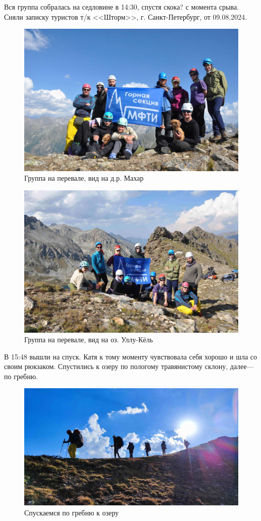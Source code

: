 Вся группа собралась на седловине в 14:30, спустя \alert{скока?} с момента срыва. Сняли записку туристов т/к <<Шторм>>, г. Санкт-Петербург, от 09.08.2024.

\begin{figure}[h!]
	\centering
	\includegraphics[width=0.7\linewidth]{../pics/DSC_0982}
	\caption{Группа на перевале, вид на д.р. Махар}
	\label{fig:DSC_0982}
\end{figure}

\begin{figure}[h!]
	\centering
	\includegraphics[width=0.7\linewidth]{../pics/DSC_0986}
	\caption{Группа на перевале, вид на оз. Уллу-Кёль}
	\label{fig:DSC_0986}
\end{figure}


В 15:48 вышли на спуск. Катя к тому моменту чувствовала себя хорошо и шла со своим рюкзаком.
Спустились к озеру по пологому травянистому склону, далее--- по гребню.

\begin{figure}[h!]
	\centering
	\includegraphics[width=0.7\linewidth]{../pics/IMG_20240820_164917.jpg}
	\caption{Спускаемся по гребню к озеру}
	\label{fig:IMG_20240820_164917.jpg}
\end{figure}

